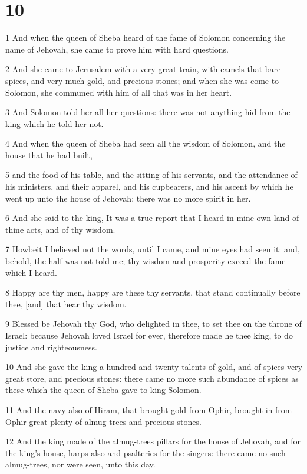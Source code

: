 \chapter{10}

\par 1 And when the queen of Sheba heard of the fame of Solomon concerning the name of Jehovah, she came to prove him with hard questions.
\par 2 And she came to Jerusalem with a very great train, with camels that bare spices, and very much gold, and precious stones; and when she was come to Solomon, she communed with him of all that was in her heart.
\par 3 And Solomon told her all her questions: there was not anything hid from the king which he told her not.
\par 4 And when the queen of Sheba had seen all the wisdom of Solomon, and the house that he had built,
\par 5 and the food of his table, and the sitting of his servants, and the attendance of his ministers, and their apparel, and his cupbearers, and his ascent by which he went up unto the house of Jehovah; there was no more spirit in her.
\par 6 And she said to the king, It was a true report that I heard in mine own land of thine acts, and of thy wisdom.
\par 7 Howbeit I believed not the words, until I came, and mine eyes had seen it: and, behold, the half was not told me; thy wisdom and prosperity exceed the fame which I heard.
\par 8 Happy are thy men, happy are these thy servants, that stand continually before thee, [and] that hear thy wisdom.
\par 9 Blessed be Jehovah thy God, who delighted in thee, to set thee on the throne of Israel: because Jehovah loved Israel for ever, therefore made he thee king, to do justice and righteousness.
\par 10 And she gave the king a hundred and twenty talents of gold, and of spices very great store, and precious stones: there came no more such abundance of spices as these which the queen of Sheba gave to king Solomon.
\par 11 And the navy also of Hiram, that brought gold from Ophir, brought in from Ophir great plenty of almug-trees and precious stones.
\par 12 And the king made of the almug-trees pillars for the house of Jehovah, and for the king's house, harps also and psalteries for the singers: there came no such almug-trees, nor were seen, unto this day.
